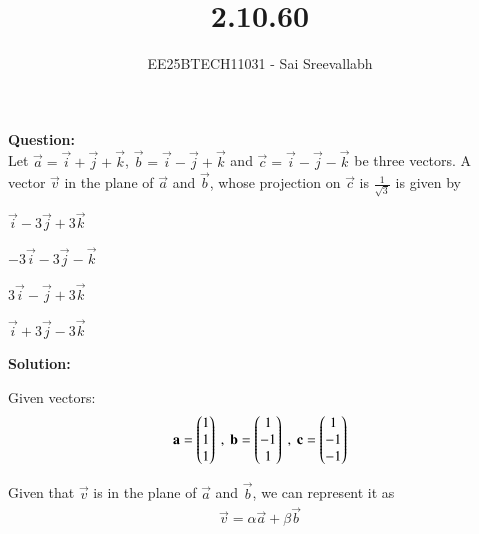 \documentclass[journal]{IEEEtran}
\begin{document}

\vspace{3cm}

\title{2.10.60}
\author {EE25BTECH11031 - Sai Sreevallabh}
{\let\newpage\relax\maketitle}

\renewcommand{\thefigure}{\theenumi}
\renewcommand{\thetable}{\theenumi}
\setlength{\intextsep}{10pt} %


\renewcommand{\thetable}{\theenumi}

\textbf{Question: }\\
Let $\vec{a}= \vec{i}+\vec{j}+\vec{k}$, $\vec{b}=\vec{i}-\vec{j}+\vec{k}$ and $\vec{c}=\vec{i}-\vec{j}-\vec{k}$ be three vectors. A vector $\vec{v}$ in the plane of $\vec{a}$ and $\vec{b}$, whose projection on $\vec{c}$ is $\frac{1}{\sqrt{3}}$ is given by

\begin{enumerate}
    \begin{multicols}{4}
        \item $\vec{i}-3\vec{j}+3\vec{k}$
        \item $-3\vec{i}-3\vec{j}-\vec{k}$
        \item $3\vec{i}-\vec{j}+3\vec{k}$
        \item $\vec{i}+3\vec{j}-3\vec{k}$
    \end{multicols}
\end{enumerate}

\textbf{Solution: }

Given vectors: 
\begin{align}
    \vec{a} = \myvec{1\\1\\1} \ , \ \vec{b} = \myvec{1\\-1\\1} \ , \ \vec{c} = \myvec{1\\-1\\-1}
\end{align}

Given that $\vec{v}$ is in the plane of $\vec{a}$ and $\vec{b}$, we can represent it as
\begin{align}
    \vec{v} = \alpha\vec{a} + \beta\vec{b}
\end{align}
\end{document}
